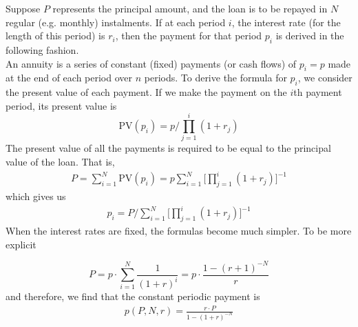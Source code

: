 \documentclass[11pt]{report}
\begin{document}
Suppose $P$ represents the principal amount, and the loan is to be repayed in $N$ regular (e.g. monthly) instalments. If at each period $i$, the interest rate (for the length of this period) is $r_i$, then the payment for that period $p_i$ is derived in the following fashion.\\

An annuity is a series of constant (fixed) payments (or cash flows) of $p_i=p$ made at the end of each period over $n$ periods. To derive the formula for $p_i$, we consider the present value of each payment. If we make the payment on the $i$th payment period, its present value is 
$$\text{PV}(p_i)=p\bigg/\prod_{j=1}^i(1+r_j)$$
The present value of all the payments is required to be equal to the principal value of the loan. That is,
\begin{align}
	P=\sum_{i=1}^N\text{PV}(p_i)=p\sum_{i=1}^N\bigg[\prod_{j=1}^i(1+r_j)\bigg]^{-1}\nonumber
\end{align}
which gives us 
\begin{align}
	p_i=P\bigg/\sum_{i=1}^N\bigg[\prod_{j=1}^i(1+r_j)\bigg]^{-1}\label{annuity_der}
\end{align}
When the interest rates are fixed, the formulas become much simpler. To be more explicit

$$P=p\cdot \sum_{i=1}^N\frac{1}{(1+r)^i}=p\cdot\frac{1-(r+1)^{-N}}{r}$$
and therefore, we find that the constant periodic payment is
\begin{align}
	p(P, N, r)=\frac{r\cdot P}{1-(1+r)^{-N}}\label{annuity_payment}
\end{align}
\\
\end{document}
